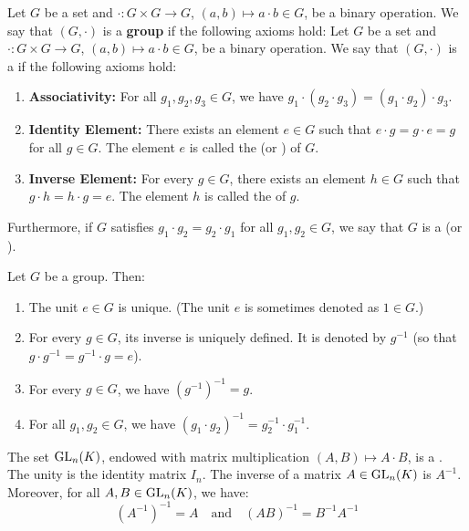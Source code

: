 \begin{definition}[Group]
Let $G$ be a set and $\cdot : G \times G \to G$, $(a,b) \mapsto a \cdot b \in G$, be a binary operation. We say that $(G, \cdot)$ is a \textbf{group} if the following axioms hold:
Let $G$ be a set and $\cdot : G \times G \to G$, $(a,b) \mapsto a \cdot b \in G$, be a binary operation. We say that $(G, \cdot)$ is a  if the following axioms hold:
\begin{enumerate}
    \item \textbf{Associativity:} For all $g_1, g_2, g_3 \in G$, we have $g_1 \cdot (g_2 \cdot g_3) = (g_1 \cdot g_2) \cdot g_3$.
    \item \textbf{Identity Element:} There exists an element $e \in G$ such that $e \cdot g = g \cdot e = g$ for all $g \in G$. The element $e$ is called the  (or ) of $G$.
    \item \textbf{Inverse Element:} For every $g \in G$, there exists an element $h \in G$ such that $g \cdot h = h \cdot g = e$. The element $h$ is called the  of $g$.
\end{enumerate}
Furthermore, if $G$ satisfies $g_1 \cdot g_2 = g_2 \cdot g_1$ for all $g_1, g_2 \in G$, we say that $G$ is a  (or ).
\end{definition}

\begin{proposition}
\label{prop:group_basic_properties}
Let $G$ be a group. Then:
\begin{enumerate}
    \item The unit $e \in G$ is unique. (The unit $e$ is sometimes denoted as $1 \in G$.)
    \item For every $g \in G$, its inverse is uniquely defined. It is denoted by $g^{-1}$ (so that $g \cdot g^{-1} = g^{-1} \cdot g = e$).
    \item For every $g \in G$, we have $(g^{-1})^{-1} = g$.
    \item For all $g_1, g_2 \in G$, we have $(g_1 \cdot g_2)^{-1} = g_2^{-1} \cdot g_1^{-1}$.
\end{enumerate}
\end{proposition}

\begin{proposition}
\label{prop:gl_group_structure}
The set $\operatorname{GL}_n(K)$, endowed with matrix multiplication $(A, B) \mapsto A \cdot B$, is a . The unity is the identity matrix $I_n$. The inverse of a matrix $A \in \operatorname{GL}_n(K)$ is $A^{-1}$. Moreover, for all $A, B \in \operatorname{GL}_n(K)$, we have:
\begin{equation*}
    (A^{-1})^{-1} = A \quad \text{and} \quad (AB)^{-1} = B^{-1}A^{-1}
\end{equation*}
\end{proposition}

